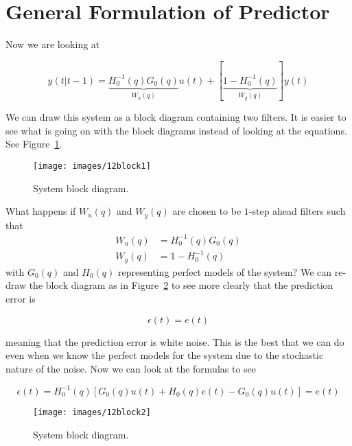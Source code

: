 \section{General Formulation of Predictor}%
\label{sec:generalpredictor}
Now we are looking at

\begin{equation*}
y(t|t-1) = \underbrace{H_0^{-1}(q)G_0(q)}_{W_u(q)}u(t) + [\underbrace{1-H_0^{-1}(q)}_{W_y(q)}]y(t)
\end{equation*}

We can draw this system as a block diagram containing two filters.
It is easier to see what is going on with the block diagrams instead of looking at the equations.
See Figure~\ref{fig:12block1}.

\begin{figure}[ht!]
\centering
\texttt{[image: images/12block1]}
\caption{System block diagram.}%
\label{fig:12block1}
\end{figure}

What happens if $W_u(q)$ and $W_y(q)$ are chosen to be $1$-step ahead filters such that
\begin{align*}
W_u(q) &= H_0^{-1}(q)G_0(q) \\
W_y(q) &= 1-H_0^{-1}(q)
\end{align*}
with $G_0(q)$ and $H_0(q)$ representing perfect models of the system? We can re-draw the block diagram as in Figure~\ref{fig:12block2} to see more clearly that the prediction error is

\begin{equation*}
\epsilon(t)=e(t)
\end{equation*}

meaning that the prediction error is white noise.
This is the best that we can do even when we know the perfect models for the system due to the stochastic nature of the noise.
Now we can look at the formulas to see

\begin{equation*}
\epsilon(t) = H_0^{-1}(q)[G_0(q)u(t) + H_0(q)e(t) - G_0(q)u(t)] = e(t)
\end{equation*}

\begin{figure}[ht!]
\centering
\texttt{[image: images/12block2]}
\caption{System block diagram.}%
\label{fig:12block2}
\end{figure}

